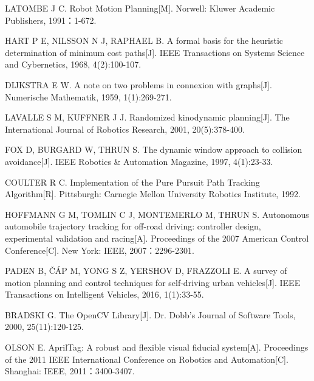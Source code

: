 \begin{enumerate}[label={[\arabic*]},leftmargin=2.2em,itemsep=0.2em]
  \item LATOMBE J C. Robot Motion Planning[M]. Norwell: Kluwer Academic Publishers, 1991：1-672.
  \item HART P E, NILSSON N J, RAPHAEL B. A formal basis for the heuristic determination of minimum cost paths[J]. IEEE Transactions on Systems Science and Cybernetics, 1968, 4(2):100-107.
  \item DIJKSTRA E W. A note on two problems in connexion with graphs[J]. Numerische Mathematik, 1959, 1(1):269-271.
  \item LAVALLE S M, KUFFNER J J. Randomized kinodynamic planning[J]. The International Journal of Robotics Research, 2001, 20(5):378-400.
  \item FOX D, BURGARD W, THRUN S. The dynamic window approach to collision avoidance[J]. IEEE Robotics \& Automation Magazine, 1997, 4(1):23-33.
  \item COULTER R C. Implementation of the Pure Pursuit Path Tracking Algorithm[R]. Pittsburgh: Carnegie Mellon University Robotics Institute, 1992.
  \item HOFFMANN G M, TOMLIN C J, MONTEMERLO M, THRUN S. Autonomous automobile trajectory tracking for off-road driving: controller design, experimental validation and racing[A]. Proceedings of the 2007 American Control Conference[C]. New York: IEEE, 2007：2296-2301.
  \item PADEN B, ČÁP M, YONG S Z, YERSHOV D, FRAZZOLI E. A survey of motion planning and control techniques for self-driving urban vehicles[J]. IEEE Transactions on Intelligent Vehicles, 2016, 1(1):33-55.
  \item BRADSKI G. The OpenCV Library[J]. Dr. Dobb’s Journal of Software Tools, 2000, 25(11):120-125.
  \item OLSON E. AprilTag: A robust and flexible visual fiducial system[A]. Proceedings of the 2011 IEEE International Conference on Robotics and Automation[C]. Shanghai: IEEE, 2011：3400-3407.
\end{enumerate}
